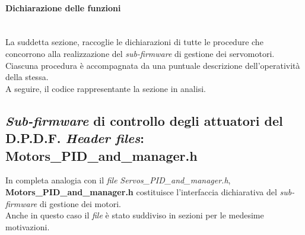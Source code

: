 \paragraph{Dichiarazione delle funzioni}\mbox{}\\
La suddetta sezione, raccoglie le dichiarazioni di tutte le procedure che concorrono alla realizzazione del \textit{sub-firmware} di gestione dei servomotori.
Ciascuna procedura è accompagnata da una puntuale descrizione dell'operatività della stessa.\\
A seguire, il codice rappresentante la sezione in analisi.



\subsection{\textit{Sub-firmware} di controllo degli attuatori del D.P.D.F. \textit{Header files}: Motors\_PID\_and\_manager.h}
\label{MotorPIDandManagerH}
In completa analogia con il \textit{file} \textit{Servos\_PID\_and\_manager.h},\\
\textbf{Motors\_PID\_and\_manager.h} costituisce l'interfaccia dichiarativa del \textit{sub-firmware} di gestione dei motori.\\
Anche in questo caso il \textit{file} è stato suddiviso in sezioni per le medesime motivazioni.

